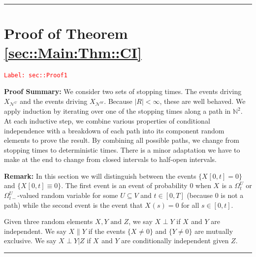 \documentclass[12pt]{article}
\newcommand{\skipLine}{\vspace{12pt}}
\newcommand{\mb}{\mathbb}
\newcommand{\mc}{\mathcal}
\newcommand{\te}{\text}
\newcommand{\tr}{\textcolor{red}}
\newcommand{\labe}[1]{\tr{\texttt{Label: #1}}}
\newcommand{\pfsum}{\textbf{Proof Summary: }}
\newcommand{\ind}{\hspace{24pt}}
\newcommand{\lin}{\rule{\linewidth}{0.4 pt}}
\renewcommand{\U}{U}							%
\newcommand{\UU}{W}								%
\newcommand{\UUU}{R}							%
\newcommand{\T}{T}								%
\renewcommand{\t}{t}							%
\newcommand{\sset}{\Omega}						%
\renewcommand{\tt}{s}							%
\newcommand{\X}{X}								%
\newcommand{\neigh}{\mc{N}}						%
\newcommand{\vind}[1]{^{#1}}					%
\newcommand{\vsi}[1]{^{#1}}						%
\newcommand{\cind}[1]{_{#1}}					%
\newcommand{\tp}[1]{(#1)}						%
\newcommand{\tip}[1]{#1}						%
\newcommand{\ts}[1]{_{#1}}						%
\newcommand{\XX}{Y}								%
\newcommand{\XXX}{Z}							%
\newcommand{\mutex}{\|}							%
\begin{document}
\lin

\section{Proof of Theorem \ref{sec::Main:Thm::CI}}
\label{sec::Proof1}\labe{sec::Proof1}

\pfsum We consider two sets of stopping times. The events driving \(\X\cind{\neigh\vind{\U}}\) and the events driving \(\X\cind{\neigh\vind{\UU}}\). Because \(|\UUU| < \infty\), these are well behaved. We apply induction by iterating over one of the stopping times along a path in \(\mb{N}^2\). At each inductive step, we combine various properties of conditional independence with a breakdown of each path into its component random elements to prove the result. By combining all possible paths, we change from stopping times to deterministic times. There is a minor adaptation we have to make at the end to change from closed intervals to half-open intervals.

\skipLine

\textbf{Remark:} In this section we will distinguish between the events \(\{\X\cind{}\tip{[0,\t]} = 0\}\) and \(\{\X\cind{}\tip{[0,\t]}\equiv 0\}\). The first event is an event of probability 0 when \(\X\cind{}\tip{}\) is a \(\sset\vsi{\U}\ts{\t}\) or \(\sset\vsi{\U}\ts{\t-}\)-valued random variable for some \(\U\subseteq V\) and \(\t \in [0,\T]\) (because 0 is not a path) while the second event is the event that \(\X\cind{}\tp{\tt} = 0\) for all \(\tt \in [0,\t]\).

\ind Given three random elements \(\X\cind{}\tip{},\XX{}{} \te{ and } \XXX{}{}\), we say \(\X\cind{}\tip{}\perp \XX{}{}\) if \(\X\cind{}\tip{}\) and \(\XX{}{}\) are independent. We say \(\X\cind{}\tip{}\mutex \XX{}{}\) if the events \(\{\X\cind{}\tip{}\neq 0\}\) and \(\{\XX{}{} \neq 0\}\) are mutually exclusive. We say \(\X\cind{}\tip{}\perp \XX{}{}|\XXX{}{}\) if \(\X\cind{}\tip{}\) and \(\XX{}{}\) are conditionally independent given \(\XXX{}{}\).

\lin
\end{document}
